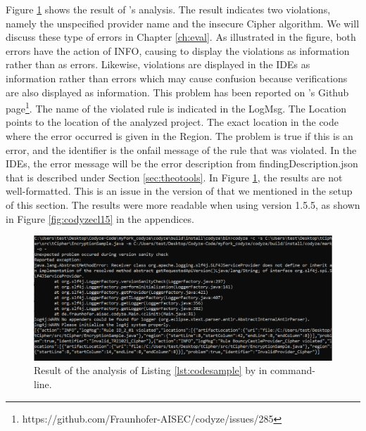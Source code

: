 Figure \ref{fig:codyzecl} shows the result of \codyze's analysis. The result indicates two violations, namely the unspecified provider name and the insecure Cipher algorithm. We will discuss these type of errors in Chapter \ref{ch:eval}. As illustrated in the figure, both errors have the action of INFO, causing \codyze{} to display the violations as information rather than as errors. Likewise, violations are displayed in the IDEs as information rather than errors which may cause confusion because verifications are also displayed as information. This problem has been reported on \codyze's Github page\footnote{https://github.com/Fraunhofer-AISEC/codyze/issues/285}. The name of the violated rule is indicated in the LogMsg. The Location points to the location of the analyzed project.  The exact location in the code where the error occurred is given in the Region. The problem is true if this is an error, and the identifier is the onfail message of the rule that was violated. In the IDEs, the error message will be the error description from findingDescription.json that is described under Section \ref{sec:theotools}. In Figure \ref{fig:codyzecl}, the results are not well-formatted. This is an issue in the version of \codyze{} that we mentioned in the setup of this section. The results were more readable when using \codyze{} version 1.5.5, as shown in Figure \ref{fig:codyzecl15} in the appendices.
\begin{figure}[H]
\centering
\includegraphics[width=1\linewidth]{thesis/figures/codyzecommand.PNG}
\caption{Result of the analysis of Listing \ref{lst:codesample} by \codyze{} in command-line.}
\label{fig:codyzecl}
\end{figure}

